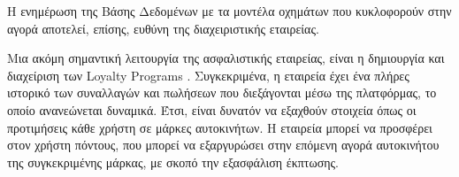 \documentclass{../ol-softwaremanual}
\begin{document}
	Η ενημέρωση της Βάσης Δεδομένων με τα μοντέλα οχημάτων που κυκλοφορούν στην αγορά αποτελεί, επίσης, ευθύνη της διαχειριστικής εταιρείας. \break
	
	Μια ακόμη σημαντική λειτουργία της ασφαλιστικής εταιρείας, είναι η δημιουργία και διαχείριση των \en Loyalty Programs \gr. Συγκεκριμένα, η εταιρεία έχει ένα πλήρες ιστορικό των συναλλαγών και πωλήσεων που διεξάγονται μέσω της πλατφόρμας, το οποίο ανανεώνεται δυναμικά. Έτσι, είναι δυνατόν να εξαχθούν στοιχεία όπως οι προτιμήσεις κάθε χρήστη σε μάρκες αυτοκινήτων. Η εταιρεία μπορεί να προσφέρει στον χρήστη πόντους, που μπορεί να εξαργυρώσει στην επόμενη αγορά αυτοκινήτου της συγκεκριμένης μάρκας, με σκοπό την εξασφάλιση έκπτωσης. \break 
	
	
	
	\newpage
	
	 \gr
	
	\vspace{10pt}
	
\end{document}
